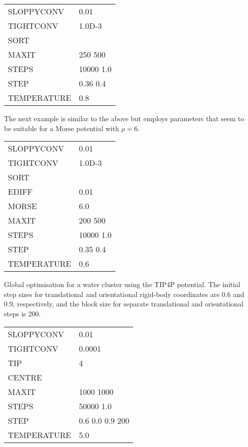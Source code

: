 {\medskip
\begin{tabular}{ll}
SLOPPYCONV & 0.01 \\
TIGHTCONV & 1.0D-3 \\
SORT \\
MAXIT & 250 500 \\
STEPS & 10000 1.0 \\
STEP & 0.36 0.4 \\
TEMPERATURE & 0.8 \\
\end{tabular}
\medskip

\noindent The next example is similar to the above but employs parameters that seem
to be suitable for a Morse potential with $\rho=6$.

\medskip
\begin{tabular}{ll}
SLOPPYCONV & 0.01 \\
TIGHTCONV & 1.0D-3 \\
SORT \\
EDIFF & 0.01\\
MORSE & 6.0\\
MAXIT & 200 500\\
STEPS & 10000 1.0\\
STEP & 0.35 0.4\\
TEMPERATURE & 0.6\\
\end{tabular}
\medskip

\noindent Global optimisation for a water cluster using the TIP4P potential.
The initial step sizes for translational and orientational rigid-body coordinates are
0.6 and 0.9, respectively, and the block size for separate translational and orientational
steps is 200.

\medskip
\begin{tabular}{ll}
SLOPPYCONV & 0.01 \\
TIGHTCONV & 0.0001 \\
TIP & 4 \\
CENTRE & \\
MAXIT & 1000 1000\\
STEPS & 50000 1.0\\
STEP & 0.6 0.0 0.9 200 \\
TEMPERATURE & 5.0\\
\end{tabular}
\medskip

}
